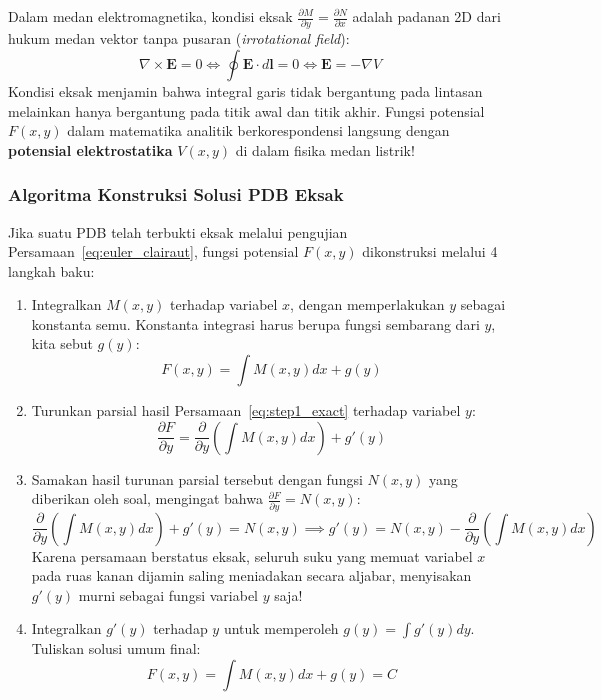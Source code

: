 \documentclass[11pt,a4paper]{article}
\theoremstyle{definition}
\begin{document}
\begin{tcolorbox}[colback=yellow!8!white,colframe=orange!80!black,title=\textbf{Makna Fisik Rekayasa: Hubungan dengan Medan Konservatif \& Hukum Faraday}]
Dalam medan elektromagnetika, kondisi eksak $\frac{\partial M}{\partial y} = \frac{\partial N}{\partial x}$ adalah padanan 2D dari hukum medan vektor tanpa pusaran (\textit{irrotational field}):
\begin{equation}
    \nabla \times \mathbf{E} = 0 \iff \oint \mathbf{E} \cdot d\mathbf{l} = 0 \iff \mathbf{E} = -\nabla V
\end{equation}
Kondisi eksak menjamin bahwa integral garis tidak bergantung pada lintasan melainkan hanya bergantung pada titik awal dan titik akhir. Fungsi potensial $F(x,y)$ dalam matematika analitik berkorespondensi langsung dengan \textbf{potensial elektrostatika} $V(x,y)$ di dalam fisika medan listrik!
\end{tcolorbox}

\subsubsection{Algoritma Konstruksi Solusi PDB Eksak}
Jika suatu PDB telah terbukti eksak melalui pengujian Persamaan~\eqref{eq:euler_clairaut}, fungsi potensial $F(x,y)$ dikonstruksi melalui 4 langkah baku:
\begin{enumerate}[leftmargin=*]
    \item Integralkan $M(x,y)$ terhadap variabel $x$, dengan memperlakukan $y$ sebagai konstanta semu. Konstanta integrasi harus berupa fungsi sembarang dari $y$, kita sebut $g(y)$:
    \begin{equation}
        F(x,y) = \int M(x,y) dx + g(y)
        \label{eq:step1_exact}
    \end{equation}
    \item Turunkan parsial hasil Persamaan~\eqref{eq:step1_exact} terhadap variabel $y$:
    \begin{equation}
        \frac{\partial F}{\partial y} = \frac{\partial}{\partial y}\left( \int M(x,y) dx \right) + g'(y)
    \end{equation}
    \item Samakan hasil turunan parsial tersebut dengan fungsi $N(x,y)$ yang diberikan oleh soal, mengingat bahwa $\frac{\partial F}{\partial y} = N(x,y)$:
    \begin{equation}
        \frac{\partial}{\partial y}\left( \int M(x,y) dx \right) + g'(y) = N(x,y) \implies g'(y) = N(x,y) - \frac{\partial}{\partial y}\left( \int M(x,y) dx \right)
    \end{equation}
    Karena persamaan berstatus eksak, seluruh suku yang memuat variabel $x$ pada ruas kanan dijamin saling meniadakan secara aljabar, menyisakan $g'(y)$ murni sebagai fungsi variabel $y$ saja!
    \item Integralkan $g'(y)$ terhadap $y$ untuk memperoleh $g(y) = \int g'(y) dy$. Tuliskan solusi umum final:
    \begin{equation}
        F(x,y) = \int M(x,y) dx + g(y) = C
    \end{equation}
\end{enumerate}
\end{document}
